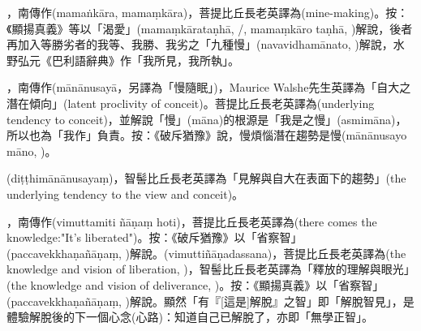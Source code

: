 \startitemgroup[noteitems]
\item{}，南傳作(mamaṅkāra, mamaṃkāra)，菩提比丘長老英譯為(mine-making)。按：《顯揚真義》等以「渴愛」(mamaṃkārataṇhā, /, mamaṃkāro taṇhā, )解說，後者再加入等勝劣者的我等、我勝、我劣之「九種慢」(navavidhamānato, )解說，水野弘元《巴利語辭典》作「我所見，我所執」。
\stopitemgroup

\startitemgroup[noteitems]
\item{}，南傳作(mānānusayā，另譯為「慢隨眠」)，Maurice Walshe先生英譯為「自大之潛在傾向」(latent proclivity of conceit)。菩提比丘長老英譯為(underlying tendency to conceit)，並解說「慢」(māna)的根源是「我是之慢」(asmimāna)，所以也為「我作」負責。按：《破斥猶豫》說，慢煩惱潛在趨勢是慢(mānānusayo māno, )。
\item{}(diṭṭhimānānusayaṃ)，智髻比丘長老英譯為「見解與自大在表面下的趨勢」(the underlying tendency to the view and conceit)。
\stopitemgroup

\startitemgroup[noteitems]
\item{}，南傳作(vimuttamiti ñāṇaṃ hoti)，菩提比丘長老英譯為(there comes the knowledge:"It's liberated")。按：《破斥猶豫》以「省察智」(paccavekkhaṇañāṇaṃ, )解說。(vimuttiñāṇadassana)，菩提比丘長老英譯為(the knowledge and vision of liberation, )，智髻比丘長老英譯為「釋放的理解與眼光」(the knowledge and vision of deliverance, )。按：《顯揚真義》以「省察智」(paccavekkhaṇañāṇaṃ, )解說。顯然「有『[這是]解脫』之智」即「解脫智見」，是體驗解脫後的下一個心念(心路)：知道自己已解脫了，亦即「無學正智」。
\stopitemgroup

